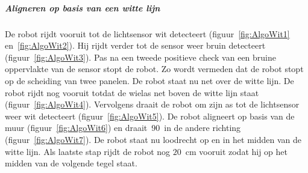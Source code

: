 \documentclass[tt3]{penoverslag}
\begin{document}
\subparagraph{Aligneren op basis van een witte lijn}
De robot rijdt vooruit tot de lichtsensor wit detecteert (figuur~\ref{fig:AlgoWit1} en~\ref{fig:AlgoWit2}). Hij rijdt verder tot de sensor weer bruin detecteert (figuur~\ref{fig:AlgoWit3}). Pas na een tweede positieve check van een bruine oppervlakte van de sensor stopt de robot. Zo wordt vermeden dat de robot stopt op de scheiding van twee panelen. De robot staat nu net over de witte lijn. De robot rijdt nog vooruit totdat de wielas net boven de witte lijn staat (figuur~\ref{fig:AlgoWit4}). Vervolgens draait de robot om zijn as tot de lichtsensor weer wit detecteert (figuur~\ref{fig:AlgoWit5}). De robot aligneert op basis van de muur (figuur~\ref{fig:AlgoWit6}) en draait~90\degree~in de andere richting (figuur~\ref{fig:AlgoWit7}). De robot staat nu loodrecht op en in het midden van de witte lijn. Als laatste stap rijdt de robot nog $20$~cm vooruit zodat hij op het midden van de volgende tegel staat.
\end{document}
